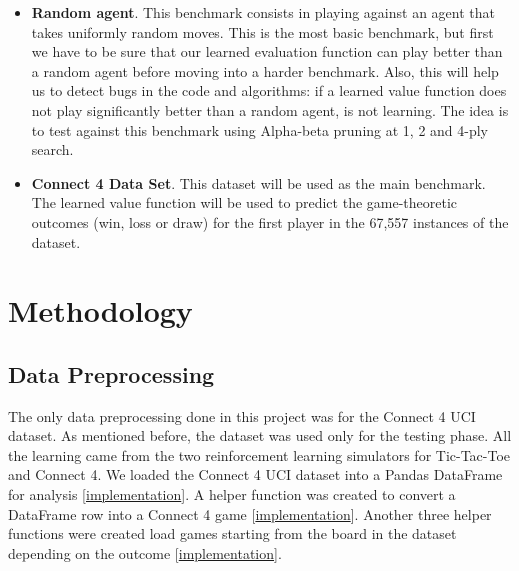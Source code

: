 \documentclass{article}
\newcommand{\GithubURL}[1]{[\href{https://github.com/davidrobles/mlnd-capstone-code/blob/master/#1}{implementation}]}
\begin{document}
\begin{itemize}

    \item \textbf{Random agent}. This benchmark consists in playing against an agent that takes
        uniformly random moves. This is the most basic benchmark, but first we have to be sure that
        our learned evaluation function can play better than a random agent before moving into a
        harder benchmark. Also, this will help us to detect bugs in the code and algorithms: if a
        learned value function does not play significantly better than a random agent, is not
        learning. The idea is to test against this benchmark using Alpha-beta pruning at 1, 2 and
        4-ply search.

    \item \textbf{Connect 4 Data Set}. This dataset will be used as the main benchmark. The learned
        value function will be used to predict the game-theoretic outcomes (win, loss or draw) for
        the first player in the 67,557 instances of the dataset.

\end{itemize}


\section{Methodology}

\subsection{Data Preprocessing}

The only data preprocessing done in this project was for the Connect 4 UCI dataset. As mentioned
before, the dataset was used only for the testing phase. All the learning came from the two
reinforcement learning simulators for Tic-Tac-Toe and Connect 4. We loaded the Connect 4 UCI dataset
into a Pandas DataFrame for analysis \GithubURL{capstone/datasets/ucic4.py\#6}. A helper function
was created to convert a DataFrame row into a Connect 4 game
\GithubURL{capstone/datasets/ucic4.py\#L24}. Another three helper functions were created load games
starting from the board in the dataset depending on the outcome
\GithubURL{capstone/datasets/ucic4.py\#L49}.
\end{document}
